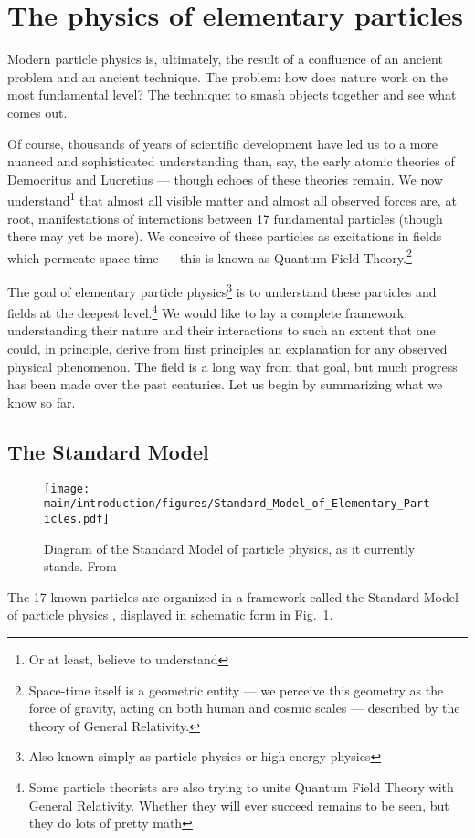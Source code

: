\documentclass[12pt,twoside,class=../reedthesis, crop=false]{standalone}
\begin{document}
\section{The physics of elementary particles}
	Modern particle physics is, ultimately, the result of a confluence of an ancient problem and an ancient technique. The problem: how does nature work on the most fundamental level? The technique: to smash objects together and see what comes out. 

	Of course, thousands of years of scientific development have led us to a more nuanced and sophisticated understanding than, say, the early atomic theories of Democritus and Lucretius --- though echoes of these theories remain. We now understand\footnote{Or at least, believe to understand} that almost all visible matter and almost all observed forces are, at root, manifestations of interactions between 17 fundamental particles (though there may yet be more). We conceive of these particles as excitations in fields which permeate space-time --- this is known as Quantum Field Theory.\footnote{Space-time itself is a geometric entity --- we perceive this geometry as the force of gravity, acting on both human and cosmic scales --- described by the theory of General Relativity.}

	The goal of elementary particle physics\footnote{Also known simply as particle physics or high-energy physics} is to understand these particles and fields at the deepest level.\footnote{Some particle theorists are also trying to unite Quantum Field Theory with General Relativity. Whether they will ever succeed remains to be seen, but they do lots of pretty math} We would like to lay a complete framework, understanding their nature and their interactions to such an extent that one could, in principle, derive from first principles an explanation for any observed physical phenomenon. The field is a long way from that goal, but much progress has been made over the past centuries. Let us begin by summarizing what we know so far.

\subsection{The Standard Model}
	\begin{figure}
	\begin{centering}
		\texttt{[image: \\main/introduction/figures/Standard\_Model\_of\_Elementary\_Particles.pdf]}
		\caption{\label{fig:standard model}Diagram of the Standard Model of particle physics, as it currently stands. From \cite{cush_standard_2019}}
	\end{centering}
	\end{figure} 
	The 17 known particles are organized in a framework called the Standard Model of particle physics \cite{larkoski_elementary_2019-1,schwartz_quantum_2014}, displayed in schematic form in Fig.~\ref{fig:standard model}.
\end{document}
